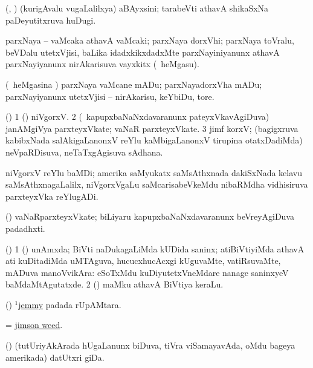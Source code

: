 \bentry
{}
\gl{\nA}
\bmng
(\AseTxrXV, \AmA) (kurigAvalu \mo vugaLalilxya) aBAyxsini; tarabeVti athavA shikaSxNa paDeyutitxruva huDugi. 
\emng
\eentry

\bentry
{}
\gl{\nA}
\bmng
parxNaya -- vaMcaka athavA vaMcaki; parxNaya dorxVhi; parxNaya toVralu, beVDalu utetxVjisi, baLika idadxkikxdadxMte parxNayiniyanunx athavA parxNayiyanunx nirAkarisuva vayxkitx (\kanmu\ heMgasu). 
\emng
\eentry

\bentry
{}
\gl{\sakirx}
\bmng
(\kanmu\ heMgasina \vi) parxNaya vaMcane mADu; parxNayadorxVha mADu; parxNayiyanunx utetxVjisi -- nirAkarisu, keYbiDu, tore. 
\emng
\eentry

\bentry
{}
\gl{\nA}
\bmng
(\ame) 
\bnum
\num{1} (\hiV) niVgorxV. 
\num{2} (\kanmu\ kapupxbaNaNxdavaranunx pateyxVkavAgiDuva) janAMgiVya parxteyxVkate; vaNaR parxteyxVkate. 
\num{3} jimf korxV; (bagigxruva kabibxNada salAkigaLanonxV reYlu kaMbigaLanonxV tirupina otatxDadiMda) neVpaRDisuva, neTaTxgAgisuva sAdhana. 
\enum
\emng
\eentry

\bentry
{}
\gl{\nA}
\bmng
niVgorxV reYlu baMDi; amerika saMyukatx saMsAthxnada dakiSxNada kelavu saMsAthxnagaLalilx, niVgorxVgaLu saMcarisabeVkeMdu nibaRMdha vidhisiruva parxteyxVka reYlugADi. 
\emng
\eentry

\bentry
{}
\gl{\nA}
\bmng
(\ame) vaNaRparxteyxVkate; biLiyaru kapupxbaNaNxdavaranunx beVreyAgiDuva padadhxti. 
\emng
\eentry

\bentry
{}
\gl{\nA}
\bmng
(\bava) 
\bnum
\num{1} (\ashi) unAmxda; BiVti naDukagaLiMda kUDida saninx; atiBiVtiyiMda athavA ati kuDitadiMda uMTAguva, hucucxhucAcxgi kUguvaMte, vatiRsuvaMte, mADuva manoVvikAra:  eSoTxMdu kuDiyutetxVneMdare nanage saninxyeV baMdaMtAgutatxde. 
\num{2} (\AmA) maMku athavA BiVtiya keraLu. 
\enum
\emng
\eentry

\bentry
{}
\gl{\nA}
\bmng
(\ame) \hyperlink{jemmy(1)}{$^1$jemmy} padada rUpAMtara. 
\emng
\eentry

\bentry
{}
\gl{\nA}
\bmng
 = \hyperlink{jimson weed}{jimson weed}. 
\emng
\eentry

\bentry
{}
\gl{\nA}
\bmng
(\ame) (tutUriyAkArada hUgaLanunx biDuva, tiVra viSamayavAda, oMdu bageya amerikada) datUtxri giDa. 
\emng
\eentry

